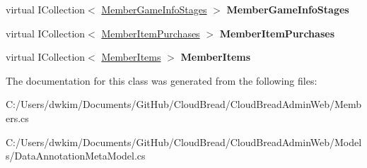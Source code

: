 \begin{DoxyCompactItemize}
\item 
virtual I\+Collection$<$ \hyperlink{a00139}{Member\+Game\+Info\+Stages} $>$ {\bfseries Member\+Game\+Info\+Stages}\hypertarget{a00145_a328295bc6340c194f2f01f6656e242ec}{}\label{a00145_a328295bc6340c194f2f01f6656e242ec}

\item 
virtual I\+Collection$<$ \hyperlink{a00141}{Member\+Item\+Purchases} $>$ {\bfseries Member\+Item\+Purchases}\hypertarget{a00145_a13c0600df285e6b999bacc0699944263}{}\label{a00145_a13c0600df285e6b999bacc0699944263}

\item 
virtual I\+Collection$<$ \hyperlink{a00143}{Member\+Items} $>$ {\bfseries Member\+Items}\hypertarget{a00145_a7df350bd0c08f38f16c5de4abf960a02}{}\label{a00145_a7df350bd0c08f38f16c5de4abf960a02}

\end{DoxyCompactItemize}


The documentation for this class was generated from the following files\+:\begin{DoxyCompactItemize}
\item 
C\+:/\+Users/dwkim/\+Documents/\+Git\+Hub/\+Cloud\+Bread/\+Cloud\+Bread\+Admin\+Web/Members.\+cs\item 
C\+:/\+Users/dwkim/\+Documents/\+Git\+Hub/\+Cloud\+Bread/\+Cloud\+Bread\+Admin\+Web/\+Models/Data\+Annotation\+Meta\+Model.\+cs\end{DoxyCompactItemize}
